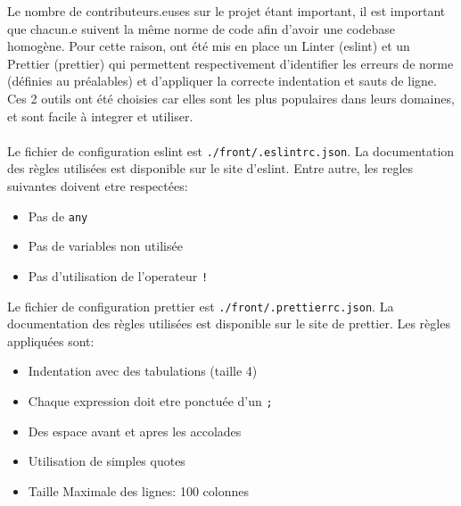 Le nombre de contributeurs.euses sur le projet étant important, il est important que chacun.e suivent la même norme de code afin d’avoir une codebase homogène.
Pour cette raison, ont été mis en place un Linter (eslint) et un Prettier (prettier) qui permettent respectivement d'identifier les erreurs de norme (définies au préalables) et d’appliquer la correcte indentation et sauts de ligne.
Ces 2 outils ont été choisies car elles sont les plus populaires dans leurs domaines, et sont facile à integrer et utiliser.
\\\\
Le fichier de configuration eslint est \verb|./front/.eslintrc.json|. La documentation des règles utilisées est disponible sur le site d’eslint.
Entre autre, les regles suivantes doivent etre respectées:

\begin{itemize}
	\item Pas de \verb|any|
	\item Pas de variables non utilisée
	\item Pas d'utilisation de l'operateur \verb|!|
\end{itemize}

Le fichier de configuration prettier est \verb|./front/.prettierrc.json|. La documentation des règles utilisées est disponible sur le site de prettier.
Les règles appliquées sont:
\begin{itemize}
	\item Indentation avec des tabulations (taille 4)
	\item Chaque expression doit etre ponctuée d'un \verb|;|
	\item Des espace avant et apres les accolades
	\item Utilisation de simples quotes
	\item Taille Maximale des lignes: 100 colonnes
\end{itemize}
